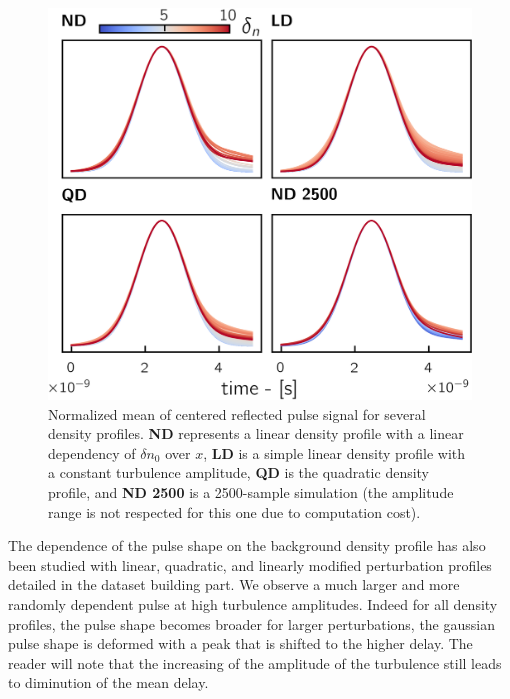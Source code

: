 \documentclass[11pt,openany]{report}
\begin{document}
\begin{multicols}{2}
    \begin{figure}[H]
        \centering
        \includegraphics[width=1\linewidth]{./figures/pulse_shape.png}
        \caption{Normalized mean of centered reflected pulse signal for several density profiles. \textbf{ND} represents a linear density profile with a linear dependency of $\delta n_0$ over $x$, \textbf{LD} is a simple linear density profile with a constant turbulence amplitude, \textbf{QD} is the quadratic density profile, and \textbf{ND 2500} is a 2500-sample simulation (the amplitude range is not respected for this one due to computation cost).}

        \label{fig:barrier}
    \end{figure}


    The dependence of the pulse shape on the background density profile has also been studied with linear, quadratic, and linearly modified perturbation profiles detailed in the dataset building part. We  observe a much larger and more randomly dependent pulse at high turbulence amplitudes. Indeed for all density profiles, the pulse shape becomes broader for larger perturbations, the gaussian pulse shape is deformed with a peak that is shifted to the higher delay. The reader will note that the increasing of the amplitude of the turbulence still leads to diminution of the mean delay.


\end{multicols}
\end{document}
